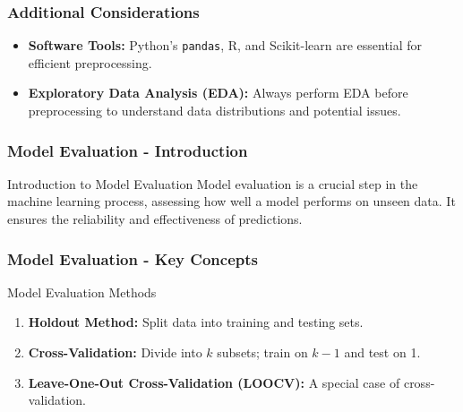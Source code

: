 \documentclass[aspectratio=169]{beamer}
\begin{document}
\begin{frame}
    \frametitle{Additional Considerations}
    \begin{itemize}
        \item \textbf{Software Tools:} Python's \texttt{pandas}, R, and Scikit-learn are essential for efficient preprocessing.
        \item \textbf{Exploratory Data Analysis (EDA):} Always perform EDA before preprocessing to understand data distributions and potential issues.
    \end{itemize}
\end{frame}

\begin{frame}[fragile]
    \frametitle{Model Evaluation - Introduction}
    \begin{block}{Introduction to Model Evaluation}
        Model evaluation is a crucial step in the machine learning process, assessing how well a model performs on unseen data. It ensures the reliability and effectiveness of predictions.
    \end{block}
\end{frame}

\begin{frame}[fragile]
    \frametitle{Model Evaluation - Key Concepts}
    \begin{block}{Model Evaluation Methods}
        \begin{enumerate}
            \item \textbf{Holdout Method:} Split data into training and testing sets.
            \item \textbf{Cross-Validation:} Divide into $k$ subsets; train on $k-1$ and test on 1.
            \item \textbf{Leave-One-Out Cross-Validation (LOOCV):} A special case of cross-validation.
        \end{enumerate}
    \end{block}
\end{frame}
\end{document}
